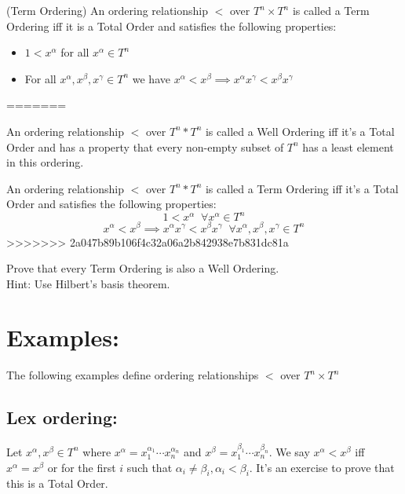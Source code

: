 \begin{definition}(Term Ordering)
An ordering relationship $<$ over $T^n\times T^n$ is called a Term Ordering iff it is a Total Order and satisfies the following properties:
\begin{itemize}
\item $1<x^{\alpha}$ for all $x^{\alpha}\in T^n$
\item For all $x^{\alpha},x^{\beta},x^{\gamma}\in T^n$ we have $x^{\alpha}<x^{\beta}\implies x^{\alpha}x^{\gamma}<x^{\beta}x^{\gamma}$
\end{itemize}
=======
\begin{definition} 
An ordering relationship $<$ over $T^n*T^n$ is called a Well Ordering iff it's a Total Order and has a property that every non-empty subset of $T^n$ has a least element in this ordering.
\end{definition}

\begin{definition} \label{def:term-order}
An ordering relationship $<$ over $T^n*T^n$ is called a Term Ordering iff it's a Total Order and satisfies the following properties:
$$1<x^{\alpha}\;\; \forall x^{\alpha}\in T^n$$
$$x^{\alpha}<x^{\beta}\implies x^{\alpha}x^{\gamma}<x^{\beta}x^{\gamma}\;\;\forall x^{\alpha},x^{\beta},x^{\gamma}\in T^n$$
>>>>>>> 2a047b89b106f4c32a06a2b842938e7b831dc81a
\end{definition}

\begin{exercise}
Prove that every Term Ordering is also a Well Ordering.\\
Hint: Use Hilbert's basis theorem.
\end{exercise}




\section*{Examples:}
The following examples define ordering relationships $<$ over $T^{n}\times T^{n}$
\subsection*{Lex ordering:}
Let $x^{\alpha},x^{\beta} \in T^{n}$ where
$x^{\alpha}=x_{1}^{\alpha_{1}}\cdots x_{n}^{\alpha_{n}}$ and $x^{\beta}=x_{1}^{\beta_{1}}\cdots x_{n}^{\beta_{n}}$. We say 
$x^{\alpha}<x^{\beta}$ iff $x^{\alpha}=x^{\beta}$ or for the first $i$ such that $\alpha_{i}\neq \beta_{i}, \alpha_{i}<\beta_{i}$.
It's an exercise to prove that this is a Total Order. 


\end{definition}
